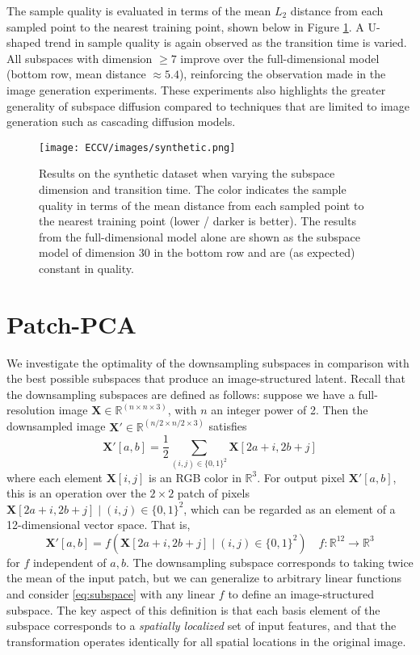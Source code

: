 \documentclass{article}
\begin{document}
The sample quality is evaluated in terms of the mean $L_2$ distance from each sampled point to the nearest training point, shown below in Figure \ref{fig:synthetic}. A U-shaped trend in sample quality is again observed as the transition time is varied. All subspaces with dimension $\ge 7$ improve over the full-dimensional model (bottom row, mean distance $\approx 5.4$), reinforcing the observation made in the image generation experiments. These experiments also highlights the greater generality of subspace diffusion compared to techniques that are limited to image generation such as cascading diffusion models.

\begin{figure}[h]
    \centering
    \texttt{[image: ECCV/images/synthetic.png]}
    \caption{Results on the synthetic dataset when varying the subspace dimension and transition time. The color indicates the sample quality in terms of the mean distance from each sampled point to the nearest training point (lower / darker is better). The results from the full-dimensional model alone are shown as the subspace model of dimension 30 in the bottom row and are (as expected) constant in quality.}
    \label{fig:synthetic}
\end{figure}

\section{Patch-PCA} \label{appendix:patch-pca}
We investigate the optimality of the downsampling subspaces in comparison with the best possible subspaces that produce an image-structured latent. Recall that the downsampling subspaces are defined as follows: suppose we have a full-resolution image $\mathbf{X} \in \mathbb{R}^{(n \times n \times 3)}$, with $n$ an integer power of 2. Then the downsampled image $\mathbf{X}' \in \mathbb{R}^{(n/2 \times n/2 \times 3)}$ satisfies
\begin{equation}
    \mathbf{X}'[a, b] = \frac{1}{2}\sum_{(i,j)\in \{0,1\}^2} \mathbf{X}[2a+i, 2b+j]
\end{equation}
where each element $\mathbf{X}[i, j]$ is an RGB color in $\mathbb{R}^3$. For output pixel $\mathbf{X}'[a,b]$, this is an operation over the $2 \times 2$ patch of pixels $\mathbf{X}[2a+i,2b+j] \mid (i, j) \in \{0,1\}^2$, which can be regarded as an element of a 12-dimensional vector space. That is,
\begin{equation} \label{eq:subspace}
    \mathbf{X}'[a, b] = f(\mathbf{X}[2a+i,2b+j] \mid (i, j) \in \{0,1\}^2) \quad f: \mathbb{R}^{12} \rightarrow \mathbb{R}^3
\end{equation}
for $f$ independent of $a, b$. The downsampling subspace corresponds to taking twice the mean of the input patch, but we can generalize to arbitrary linear functions and consider \eqref{eq:subspace} with any linear $f$ to define an image-structured subspace. The key aspect of this definition is that each basis element of the subspace corresponds to a \emph{spatially localized} set of input features, and that the transformation operates identically for all spatial locations in the original image.
\end{document}
